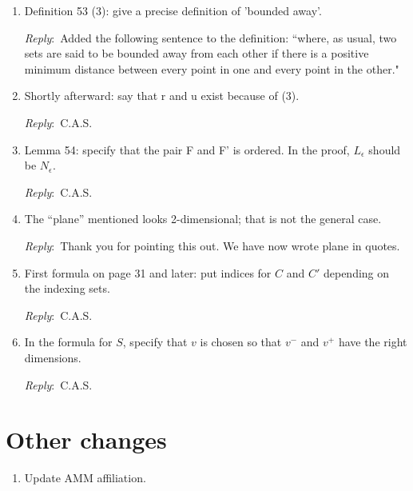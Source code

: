 \documentclass{amsart}
\newcommand{\ar}{\medskip\noindent\textit{Reply}:\ }
\newcommand{\cas}{\ar C.A.S.}
\begin{document}
\begin{enumerate}
	\item Definition 53 (3): give a precise definition of 'bounded away'.

	\ar Added the following sentence to the definition: ``where, as usual, two sets are said to be bounded away from each other if there is a positive minimum distance between every point in one and every point in the other."

	\item Shortly afterward: say that r and u exist because of (3).

	\cas

	\item Lemma 54: specify that the pair F and F' is ordered. In the proof, $L_\epsilon$ should be $N_\epsilon$.

	\cas

	\item The “plane” mentioned looks 2-dimensional; that is not the general case.

	\ar Thank you for pointing this out. We have now wrote plane in quotes.

	\item First formula on page 31 and later: put indices for $C$ and $C'$ depending on the indexing sets.

	\cas

	\item In the formula for $S$, specify that $v$ is chosen so that $v^-$ and $v^+$ have the right dimensions.

	\cas
\end{enumerate}

\section{Other changes}

\begin{enumerate}
	\item Update AMM affiliation.

\end{enumerate}
\end{document}
